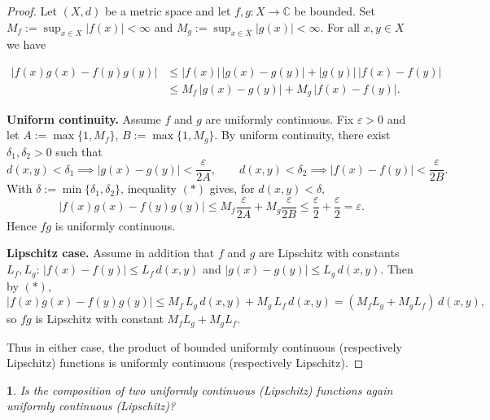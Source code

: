 \documentclass[12pt, a4paper]{report}
\theoremstyle{spaced}
\newtheorem{exercise}{}
\newcommand{\setexercise}[1]{\setcounter{exercise}{#1-1}}
\begin{document}
\begin{proof}
	Let $(X,d)$ be a metric space and let $f,g:X\to\mathbb{C}$ be bounded.
	Set $M_f:=\sup_{x\in X}|f(x)|<\infty$ and $M_g:=\sup_{x\in X}|g(x)|<\infty$.
	For all $x,y\in X$ we have

	\begin{align}
		|f(x)g(x)-f(y)g(y)|
		 & \le |f(x)|\,|g(x)-g(y)| + |g(y)|\,|f(x)-f(y)| \nonumber \\
		 & \le M_f\,|g(x)-g(y)| + M_g\,|f(x)-f(y)|.
		\tag{$*$}
	\end{align}



	\medskip
	\textbf{Uniform continuity.}
	Assume $f$ and $g$ are uniformly continuous. Fix $\varepsilon>0$ and let
	$A:=\max\{1,M_f\}$, $B:=\max\{1,M_g\}$.
	By uniform continuity, there exist $\delta_1,\delta_2>0$ such that
	\[
		d(x,y)<\delta_1 \implies |g(x)-g(y)|<\frac{\varepsilon}{2A},
		\qquad
		d(x,y)<\delta_2 \implies |f(x)-f(y)|<\frac{\varepsilon}{2B}.
	\]
	With $\delta:=\min\{\delta_1,\delta_2\}$, inequality $(*)$ gives, for $d(x,y)<\delta$,
	\[
		|f(x)g(x)-f(y)g(y)|
		\le M_f\frac{\varepsilon}{2A}+M_g\frac{\varepsilon}{2B}
		\le \frac{\varepsilon}{2}+\frac{\varepsilon}{2}=\varepsilon.
	\]
	Hence $fg$ is uniformly continuous.

	\medskip
	\textbf{Lipschitz case.}
	Assume in addition that $f$ and $g$ are Lipschitz with constants $L_f,L_g$:
	$|f(x)-f(y)|\le L_f\,d(x,y)$ and $|g(x)-g(y)|\le L_g\,d(x,y)$.
	Then by $(*)$,
	\[
		|f(x)g(x)-f(y)g(y)|
		\le M_f\,L_g\,d(x,y) + M_g\,L_f\,d(x,y)
		= (M_fL_g+M_gL_f)\,d(x,y),
	\]
	so $fg$ is Lipschitz with constant $M_fL_g+M_gL_f$.

	Thus in either case, the product of bounded uniformly continuous (respectively Lipschitz)
	functions is uniformly continuous (respectively Lipschitz).
\end{proof}

\setexercise{4}
\begin{exercise}
	Is the composition of two uniformly continuous (Lipschitz) functions again uniformly continuous (Lipschitz)?
\end{exercise}
\end{document}
